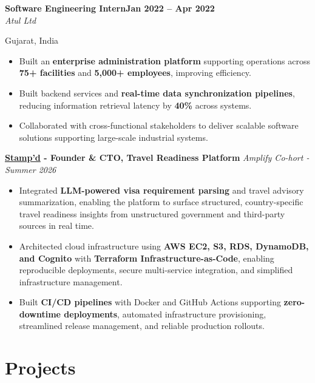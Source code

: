 \documentclass[letterpaper,8pt]{extarticle}
\newcommand{\entryline}[3]{%
  \noindent\textbf{#1}\hfill\textbf{#2} \\
  \noindent\textit{#3}%
}
\begin{document}
\entryline
{Software Engineering Intern}
{Jan 2022 -- Apr 2022}
{Atul Ltd}
{Gujarat, India}
\vspace{0pt}
\begin{itemize}
    \item Built an \textbf{enterprise administration platform} supporting operations across \textbf{75+ facilities} and \textbf{5,000+ employees}, improving efficiency.

    \item Built backend services and \textbf{real-time data synchronization pipelines}, reducing information retrieval latency by \textbf{40\%} across systems.

    \item Collaborated with cross-functional stakeholders to deliver scalable software solutions supporting large-scale industrial systems.
\end{itemize}
\vspace{1pt}
\noindent\textbf{\href{https://getstampd.org}{\textcolor{linkblue}{Stamp'd}} - Founder \& CTO, Travel Readiness Platform }
\hfill \textit{Amplify Co-hort - Summer 2026}
\vspace{0pt}
\begin{itemize}
\item Integrated \textbf{LLM-powered visa requirement parsing} and travel advisory summarization, enabling the platform to surface structured, country-specific travel readiness insights from unstructured government and third-party sources in real time.
\item Architected cloud infrastructure using \textbf{AWS EC2, S3, RDS, DynamoDB, and Cognito} with \textbf{Terraform Infrastructure-as-Code}, enabling reproducible deployments, secure multi-service integration, and simplified infrastructure management.
\item Built \textbf{CI/CD pipelines} with Docker and GitHub Actions supporting \textbf{zero-downtime deployments}, automated infrastructure provisioning, streamlined release management, and reliable production rollouts.
\end{itemize}
\section{Projects}
\vspace{3pt}
\end{document}
